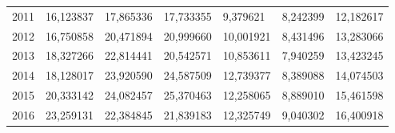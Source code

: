 \begin{table}
\begin{tabular}{p{1cm}p{2cm}p{2cm}p{2cm}p{2cm}p{2cm}p{2cm}}
 2011 &    16,123837 &                  17,865336 &                         17,733355 &                       9,379621 &                        8,242399 & 12,182617 \\
 2012 &    16,750858 &                  20,471894 &                         20,999660 &                      10,001921 &                        8,431496 & 13,283066 \\
 2013 &    18,327266 &                  22,814441 &                         20,542571 &                      10,853611 &                        7,940259 & 13,423245 \\
 2014 &    18,128017 &                  23,920590 &                         24,587509 &                      12,739377 &                        8,389088 & 14,074503 \\
 2015 &    20,333142 &                  24,082457 &                         25,370463 &                      12,258065 &                        8,889010 & 15,461598 \\
 2016 &    23,259131 &                  22,384845 &                         21,839183 &                      12,325749 &                        9,040302 & 16,400918 \\
\bottomrule
\end{tabular}
\end{table}
